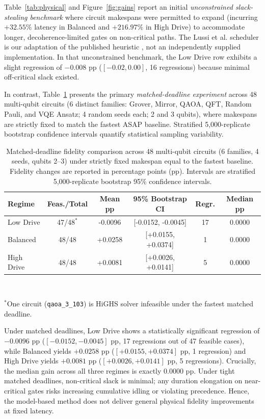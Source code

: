 \documentclass[10pt,letterpaper,journal]{IEEEtran}
\begin{document}
Table~\ref{tab:physical} and Figure~\ref{fig:gains} report an initial \emph{unconstrained slack-stealing benchmark} where circuit makespans were permitted to expand (incurring $+32.55\%$ latency in Balanced and $+216.97\%$ in High Drive) to accommodate longer, decoherence-limited gates on non-critical paths. The Lussi et al. scheduler is our adaptation of the published heuristic \cite{lussi}, not an independently supplied implementation. In that unconstrained benchmark, the Low Drive row exhibits a slight regression of $-0.008$ pp ($[-0.02, 0.00]$, 16 regressions) because minimal off-critical slack existed.

In contrast, Table~\ref{tab:matched_deadlines} presents the primary \emph{matched-deadline experiment} across 48 multi-qubit circuits (6 distinct families: Grover, Mirror, QAOA, QFT, Random Pauli, and VQE Ansatz; 4 random seeds each; 2 and 3 qubits), where makespans are strictly fixed to match the fastest ASAP baseline. Stratified 5,000-replicate bootstrap confidence intervals quantify statistical sampling variability.

\begin{table}[t]
\caption{Matched-deadline fidelity comparison across 48 multi-qubit circuits (6 families, 4 seeds, qubits 2--3) under strictly fixed makespan equal to the fastest baseline. Fidelity changes are reported in percentage points (pp). Intervals are stratified 5,000-replicate bootstrap 95\% confidence intervals.}\label{tab:matched_deadlines}
\centering\footnotesize\setlength{\tabcolsep}{1.8pt}
\begin{tabular}{lccccc}\toprule
Regime & Feas./Total & Mean pp & 95\% Bootstrap CI & Regr. & Median pp \\\midrule
Low Drive  & 47/48$^*$ & -0.0096 & [-0.0152, -0.0045] & 17 & 0.0000 \\
Balanced   & 48/48     & +0.0258 & [+0.0155, +0.0374] & 1  & 0.0000 \\
High Drive & 48/48     & +0.0081 & [+0.0026, +0.0141] & 5  & 0.0000 \\
\bottomrule
\end{tabular}\\[2pt]
\parbox{0.96\columnwidth}{\scriptsize $^*$One circuit (\texttt{qaoa\_3\_103}) is HiGHS solver infeasible under the fastest matched deadline.}
\end{table}

Under matched deadlines, Low Drive shows a statistically significant regression of $-0.0096$ pp ($[-0.0152, -0.0045]$ pp, 17 regressions out of 47 feasible cases), while Balanced yields $+0.0258$ pp ($[+0.0155, +0.0374]$ pp, 1 regression) and High Drive yields $+0.0081$ pp ($[+0.0026, +0.0141]$ pp, 5 regressions). Crucially, the median gain across all three regimes is exactly $0.0000$ pp. Under tight matched deadlines, non-critical slack is minimal; any duration elongation on near-critical gates risks increasing cumulative idling or violating precedence. Hence, the model-based method does not deliver general physical fidelity improvements at fixed latency.
\end{document}

